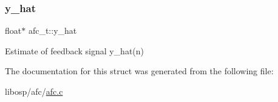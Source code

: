 \mbox{\label{structafc__t_a7c5db3530c08c1bec07d6f4bf921537d}} 
\subsubsection{\texorpdfstring{y\+\_\+hat}{y\_hat}}
{\footnotesize\ttfamily float$\ast$ afc\+\_\+t\+::y\+\_\+hat}



Estimate of feedback signal y\+\_\+hat(n) 



The documentation for this struct was generated from the following file\+:\begin{DoxyCompactItemize}
\item 
libosp/afc/\mbox{\hyperlink{afc_8c}{afc.\+c}}\end{DoxyCompactItemize}
